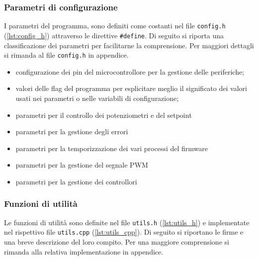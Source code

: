 \subsubsection{Parametri di configurazione}
I parametri del programma, sono definiti come costanti nel file \verb|config.h| (\autoref{lst:config_h})
attraverso le direttive \verb|#define|. Di seguito si riporta una classificazione dei parametri per facilitarne la
comprensione. Per maggiori dettagli si rimanda al file \verb|config.h| in appendice.
\begin{itemize}
	\item configurazione dei pin del microcontrollore per la gestione delle periferiche;
	\item valori delle flag del programma per esplicitare meglio il significato dei valori usati nei parametri o nelle
	variabili di configurazione;
	\item parametri per il controllo dei potenziometri e del setpoint
	\item parametri per la gestione degli errori
	\item parametri per la temporizzazione dei vari processi del firmware
	\item parametri per la gestione del segnale PWM
	\item parametri per la gestione dei controllori
\end{itemize}

\subsubsection{Funzioni di utilità}
Le funzioni di utilità sono definite nel file \verb|utils.h| (\autoref{lst:utils_h}) e implementate nel
rispettivo file \verb|utils.cpp| (\autoref{lst:utils_cpp}). Di seguito si riportano le firme e una breve descrizione
del loro compito. Per una maggiore comprensione si rimanda alla relativa implementazione in appendice.

